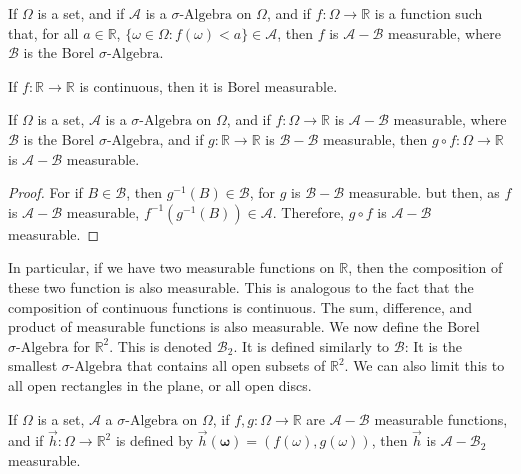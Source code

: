         \begin{theorem}
            If $\Omega$ is a set, and if $\mathcal{A}$ is a
            $\sigma\text{-Algebra}$ on $\Omega$, and if
            $f:\Omega\rightarrow\mathbb{R}$ is a function such that, for all
            $a\in\mathbb{R}$, $\{\omega\in\Omega:f(\omega)<a\}\in\mathcal{A}$,
            then $f$ is $\mathcal{A}-\mathcal{B}$ measurable, where
            $\mathcal{B}$ is the Borel $\sigma\text{-Algebra}$.
        \end{theorem}
        \begin{theorem}
            If $f:\mathbb{R}\rightarrow\mathbb{R}$ is continuous, then it is
            Borel measurable.
        \end{theorem}
        \begin{theorem}
            If $\Omega$ is a set, $\mathcal{A}$ is a $\sigma\text{-Algebra}$ on
            $\Omega$, and if $f:\Omega\rightarrow\mathbb{R}$ is
            $\mathcal{A}-\mathcal{B}$ measurable, where $\mathcal{B}$ is the
            Borel $\sigma\text{-Algebra}$, and if
            $g:\mathbb{R}\rightarrow\mathbb{R}$ is $\mathcal{B}-\mathcal{B}$
            measurable, then $g\circ{f}:\Omega\rightarrow\mathbb{R}$ is
            $\mathcal{A}-\mathcal{B}$ measurable.
        \end{theorem}
        \begin{proof}
            For if $B\in\mathcal{B}$, then $g^{-1}(B)\in\mathcal{B}$, for $g$ is
            $\mathcal{B}-\mathcal{B}$ measurable. but then, as $f$ is
            $\mathcal{A}-\mathcal{B}$ measurable,
            $f^{-1}(g^{-1}(B))\in\mathcal{A}$. Therefore, $g\circ{f}$ is
            $\mathcal{A}-\mathcal{B}$ measurable.
        \end{proof}
        In particular, if we have two measurable functions on $\mathbb{R}$, then
        the composition of these two function is also measurable. This is
        analogous to the fact that the composition of continuous functions is
        continuous. The sum, difference, and product of measurable functions is
        also measurable. We now define the Borel $\sigma\text{-Algebra}$ for
        $\mathbb{R}^{2}$. This is denoted $\mathcal{B}_{2}$. It is defined
        similarly to $\mathcal{B}$: It is the smallest $\sigma\text{-Algebra}$
        that contains all open subsets of $\mathbb{R}^{2}$. We can also limit
        this to all open rectangles in the plane, or all open discs.
        \begin{theorem}
            If $\Omega$ is a set, $\mathcal{A}$ a $\sigma\text{-Algebra}$ on
            $\Omega$, if $f,g:\Omega\rightarrow\mathbb{R}$ are
            $\mathcal{A}-\mathcal{B}$ measurable functions, and if
            $\vec{h}:\Omega\rightarrow\mathbb{R}^{2}$ is defined by
            $\vec{h}(\boldsymbol{\omega})=(f(\omega),g(\omega))$, then
            $\vec{h}$ is $\mathcal{A}-\mathcal{B}_{2}$ measurable.
        \end{theorem}

